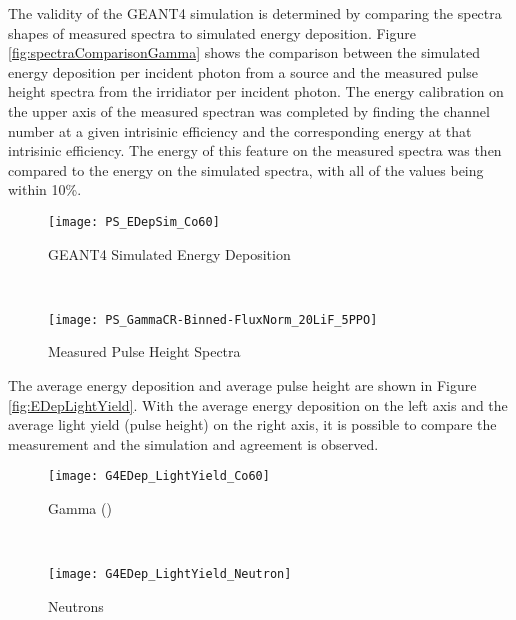 \documentclass[draftcls,onecolumn]{IEEEtran}
\begin{document}
The validity of the GEANT4 simulation is determined by comparing the spectra shapes of measured spectra to simulated energy deposition.
Figure \ref{fig:spectraComparisonGamma} shows the comparison between the simulated energy deposition per incident photon from a  source and the measured pulse height spectra from the  irridiator per incident photon.
The energy calibration on the upper axis of the measured spectran was completed by finding the channel number at a given intrisinic efficiency and the corresponding energy at that intrisinic efficiency.
The energy of this feature on the measured spectra was then compared to the energy on the simulated spectra, with all of the values being within 10\%.
\begin{figure*}[ht]
	\centering
	\begin{subfigure}[b]{0.45\textwidth}
    		\texttt{[image: PS\_EDepSim\_Co60]}
		\caption{GEANT4 Simulated Energy Deposition}
	\end{subfigure}%
	~
	\begin{subfigure}[b]{0.45\textwidth}
    \texttt{[image: PS\_GammaCR-Binned-FluxNorm\_20LiF\_5PPO]}
		\caption{Measured Pulse Height Spectra}
	\end{subfigure}%
	\caption{Comparison of the energy deposition and binned pulse height spectra for validation. The spectra have the same shape, indicating agreement. The fabricated films greater than \SI{600}{\um} were of poor optical quality and therefore their results are not shown.}
	\label{fig:spectraComparisonGamma}
\end{figure*}
The average energy deposition and average pulse height are shown in Figure \ref{fig:EDepLightYield}. 
With the average energy deposition on the left axis and the average light yield (pulse height) on the right axis, it is possible to compare the measurement and the simulation and agreement is observed.
\begin{figure*}[ht]
	\centering
	\begin{subfigure}[b]{0.45\textwidth}
    		\texttt{[image: G4EDep\_LightYield\_Co60]}
		\caption{Gamma ()}
	\end{subfigure}%
	~
	\begin{subfigure}[b]{0.45\textwidth}
    		\texttt{[image: G4EDep\_LightYield\_Neutron]}
		\caption{Neutrons}
	\end{subfigure}%
	\caption{Average Energy Deposition and Measured Light Yield. The solid lines are calculated values and the red dots are measurments.}
	\label{fig:EDepLightYield}
\end{figure*}
\end{document}
